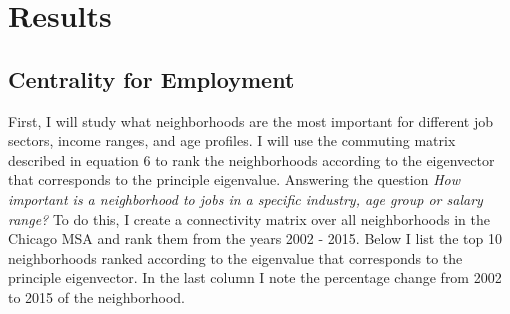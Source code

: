 \documentclass{article}
\theoremstyle{definition}
\theoremstyle{remark}
\begin{document}
\section{Results}
\subsection{Centrality for Employment}
First, I will study what neighborhoods are the most important for different job sectors, income ranges, and age profiles.  I will use the commuting matrix described in equation 6 to rank the neighborhoods according to the eigenvector that corresponds to the principle eigenvalue.  Answering the question \textit{How important is a neighborhood to jobs in a specific industry, age group or salary range?}  To do this, I create a connectivity matrix over all neighborhoods in the Chicago MSA and rank them from the years 2002 - 2015.  Below I list the top 10 neighborhoods ranked according to the eigenvalue that corresponds to the principle eigenvector.  In the last column I note the percentage change from 2002 to 2015 of the neighborhood. \\
\end{document}
